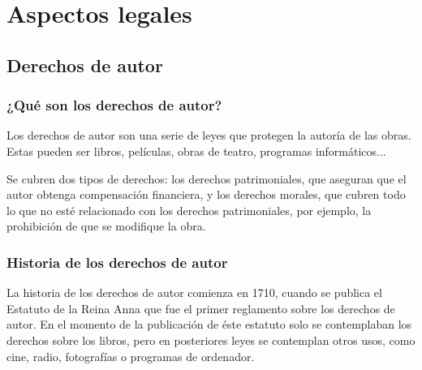 
\chapter{Aspectos legales} %
\label{cha:AspectosLegales}

    \section{Derechos de autor} %
    \label{sec:DerechosDeAutor}
        \subsection{¿Qué son los derechos de autor?} %
        \label{sub:QueSonLosDerechosDeAutor}

            Los derechos de autor son una serie de leyes que protegen la autoría de las obras. Estas pueden ser libros,
            películas, obras de teatro, programas informáticos...\newline

            Se cubren dos tipos de derechos: los derechos patrimoniales, que aseguran que el autor obtenga compensación
            financiera, y los derechos morales, que cubren todo lo que no esté relacionado con los derechos
            patrimoniales, por ejemplo, la prohibición de que se modifique la obra.\cite{derechos_ompi}


        \subsection{Historia de los derechos de autor} %
        \label{sub:HistoriaDeLosDerechosDeAutor}

            La historia de los derechos de autor comienza en 1710, cuando se publica el Estatuto de la Reina
            Anna\cite{estatuto_anna} que fue el primer reglamento sobre los derechos de autor. En el momento de la
            publicación de éste estatuto solo se contemplaban los derechos sobre los libros, pero en posteriores leyes
            se contemplan otros usos, como cine, radio, fotografías o programas de ordenador.\newline

